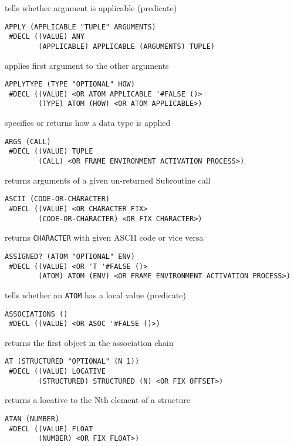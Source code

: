 \documentclass[a4paper,]{article}
\begin{document}
tells whether argument is applicable (predicate)

\begin{verbatim}
APPLY (APPLICABLE "TUPLE" ARGUMENTS)
 #DECL ((VALUE) ANY
        (APPLICABLE) APPLICABLE (ARGUMENTS) TUPLE)
\end{verbatim}

applies first argument to the other arguments

\begin{verbatim}
APPLYTYPE (TYPE "OPTIONAL" HOW)
 #DECL ((VALUE) <OR ATOM APPLICABLE '#FALSE ()>
        (TYPE) ATOM (HOW) <OR ATOM APPLICABLE>)
\end{verbatim}

specifies or returns how a data type is applied

\begin{verbatim}
ARGS (CALL)
 #DECL ((VALUE) TUPLE
        (CALL) <OR FRAME ENVIRONMENT ACTIVATION PROCESS>)
\end{verbatim}

returns arguments of a given un-returned Subroutine call

\begin{verbatim}
ASCII (CODE-OR-CHARACTER)
 #DECL ((VALUE) <OR CHARACTER FIX>
        (CODE-OR-CHARACTER) <OR FIX CHARACTER>)
\end{verbatim}

returns \texttt{CHARACTER} with given ASCII code or vice versa

\begin{verbatim}
ASSIGNED? (ATOM "OPTIONAL" ENV)
 #DECL ((VALUE) <OR 'T '#FALSE ()>
        (ATOM) ATOM (ENV) <OR FRAME ENVIRONMENT ACTIVATION PROCESS>)
\end{verbatim}

tells whether an \texttt{ATOM} has a local value (predicate)

\begin{verbatim}
ASSOCIATIONS ()
 #DECL ((VALUE) <OR ASOC '#FALSE ()>)
\end{verbatim}

returns the first object in the association chain

\begin{verbatim}
AT (STRUCTURED "OPTIONAL" (N 1))
 #DECL ((VALUE) LOCATIVE
        (STRUCTURED) STRUCTURED (N) <OR FIX OFFSET>)
\end{verbatim}

returns a locative to the Nth element of a structure

\begin{verbatim}
ATAN (NUMBER)
 #DECL ((VALUE) FLOAT
        (NUMBER) <OR FIX FLOAT>)
\end{verbatim}
\end{document}
